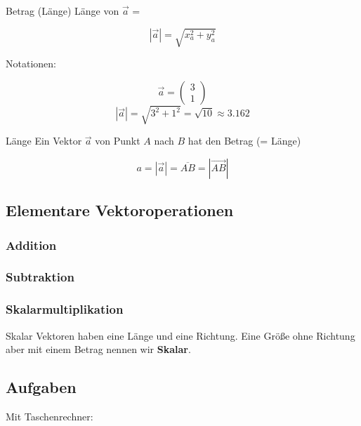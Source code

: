     \begin{gesetz}{Betrag (Länge)}{}
      Länge von $\vec{a}$ =

      $$|\vec{a}| = \sqrt{x_a^2 + y_a^2}$$
      \end{gesetz}
    Notationen:

    \begin{beispiel}{}{}
      $$ \vec{a}= \begin{pmatrix} 3\\ 1\end{pmatrix}$$
        $$|\vec{a}| = \sqrt{3^2+1^2} = \sqrt{10}\approx 3.162$$
      \end{beispiel}
    
    \begin{definition}{Länge}{}
      Ein Vektor $\vec{a}$ von Punkt $A$ nach $B$ hat den Betrag (= Länge)

      $$a = |\vec{a}| = \overline{AB} = \left|\overrightarrow{AB}\right|$$
    \end{definition}

\newpage
    
\subsection{Elementare Vektoroperationen}

\subsubsection{Addition}

\subsubsection{Subtraktion}
\newpage

\subsubsection{Skalarmultiplikation}
\begin{definition}{Skalar}{}
  Vektoren haben eine Länge und eine Richtung. Eine Größe ohne
  Richtung aber mit einem Betrag nennen wir \textbf{Skalar}. 
\end{definition}
\newpage


\subsection*{Aufgaben}

Mit Taschenrechner:

\newpage
